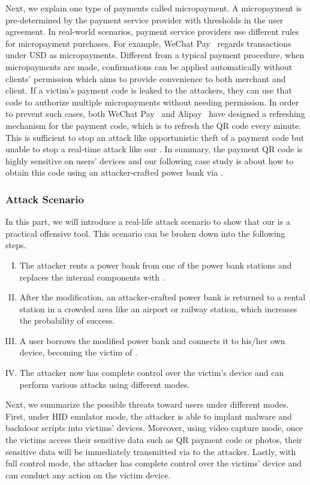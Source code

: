 Next, we explain one type of payments called micropayment. A micropayment is pre-determined by the payment
service provider with thresholds in the user agreement. In real-world scenarios, payment service providers use different rules
for micropayment purchases. For example, WeChat
Pay~\cite{Wechat-pay} regards transactions under USD  as
micropayments.  Different from a typical payment procedure, when micropayments
are made, confirmations can be applied automatically without clients'
permission which aims to provide convenience to both merchant and client.  If a
victim's payment code is leaked to the attackers, they can use that code to
authorize multiple micropayments without needing permission.  In order to prevent such
cases, both WeChat Pay~\cite{Wechat-pay} and Alipay~\cite{AliPay} have designed a refreshing mechanism for the
payment code, which is to refresh the QR code every minute. This is sufficient
to stop an attack like opportunistic theft of a payment code but unable to stop a real-time attack like our
\tool.  In summary, the payment QR code is highly sensitive on users' devices
and our following case study is about how to obtain this code using an
attacker-crafted power bank via \tool.

\subsubsection{Attack Scenario}

In this part, we will introduce a real-life attack scenario to show that our
\tool is a practical offensive tool.  This scenario can be broken down into the
following steps.

\begin{enumerate}[I. ]
	\item The attacker rents a power bank from one of the power bank stations and replaces the internal components with \tool.
	\item After the modification, an attacker-crafted power bank is returned to a rental station in a crowded area like an airport or railway station, which increases the probability of success.
	\item A user borrows the modified power bank and connects it to his/her own device, becoming the victim of \tool.
	\item The attacker now has complete control over the victim's device and can perform various attacks using different modes.
\end{enumerate}

Next, we summarize the possible threats toward users under different modes.
First, under \ac{HID} emulator mode, the attacker is able to implant malware and backdoor scripts into victims' devices. Moreover, using video capture mode, once the victims access their sensitive data such as QR payment  code or photos, their sensitive data will be immediately transmitted via \tool to the attacker. Lastly, with full control mode, the attacker has complete control over the victims' device and can conduct any action on the victim device.

